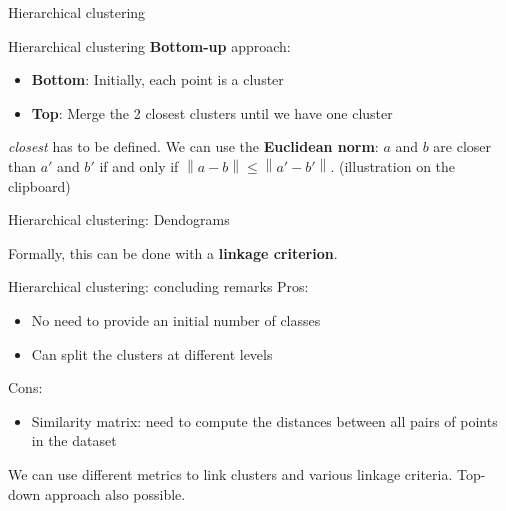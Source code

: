 \documentclass{beamer}
\newcommand{\norm}[1]{\left\lVert#1\right\rVert}
\begin{document}
\begin{frame}
	\center \Huge{Hierarchical clustering}
\end{frame}

\begin{frame}{Hierarchical clustering}
\textbf{Bottom-up} approach:
\begin{itemize}
	\item \textbf{Bottom}: Initially, each point is a cluster
	\item \textbf{Top}: Merge the 2 closest clusters until we have one cluster
\end{itemize}
\vfill
\pause
\textit{closest} has to be defined. We can use the \textbf{Euclidean norm}: $a$ and $b$ are closer than $a'$ and $b'$ if and only if $\norm{a - b} \leq \norm{a' - b'}$.
\pause
\vfill
(illustration on the clipboard)
\end{frame}

\begin{frame}{Hierarchical clustering: Dendograms}
\vfill
\pause
Formally, this can be done with a \textbf{linkage criterion}.
\end{frame}

\begin{frame}{Hierarchical clustering: concluding remarks}
Pros:
\begin{itemize}
	\item No need to provide an initial number of classes
	\item Can split the clusters at different levels
\end{itemize}
\vfill
\pause
Cons:
\begin{itemize}
	\item Similarity matrix: need to compute the distances between all pairs of points in the dataset
\end{itemize}
\vfill
\pause
We can use different metrics to link clusters and various linkage criteria.
\vfill
\pause
Top-down approach also possible.
\end{frame}
\end{document}
